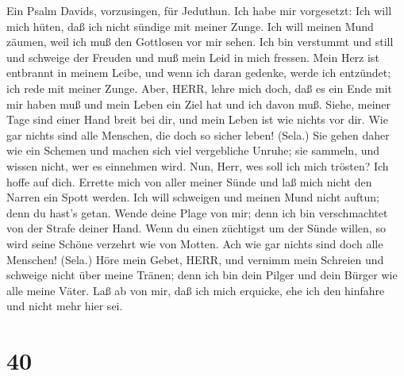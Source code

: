  Ein Psalm Davids, vorzusingen, für Jeduthun. Ich habe mir
vorgesetzt: Ich will mich hüten, daß ich nicht sündige mit meiner Zunge.
Ich will meinen Mund zäumen, weil ich muß den Gottlosen vor mir sehen.
 Ich bin verstummt und still und schweige der Freuden und
muß mein Leid in mich fressen.  Mein Herz ist entbrannt in
meinem Leibe, und wenn ich daran gedenke, werde ich entzündet; ich rede
mit meiner Zunge.  Aber, HERR, lehre mich doch, daß es ein
Ende mit mir haben muß und mein Leben ein Ziel hat und ich davon muß.
 Siehe, meiner Tage sind einer Hand breit bei dir, und mein
Leben ist wie nichts vor dir. Wie gar nichts sind alle Menschen, die
doch so sicher leben! (Sela.)  Sie gehen daher wie ein
Schemen und machen sich viel vergebliche Unruhe; sie sammeln, und wissen
nicht, wer es einnehmen wird.  Nun, Herr, wes soll ich mich
trösten? Ich hoffe auf dich.  Errette mich von aller meiner
Sünde und laß mich nicht den Narren ein Spott werden.  Ich
will schweigen und meinen Mund nicht auftun; denn du hast's getan.
 Wende deine Plage von mir; denn ich bin verschmachtet von
der Strafe deiner Hand.  Wenn du einen züchtigst um der
Sünde willen, so wird seine Schöne verzehrt wie von Motten. Ach wie gar
nichts sind doch alle Menschen! (Sela.)  Höre mein Gebet,
HERR, und vernimm mein Schreien und schweige nicht über meine Tränen;
denn ich bin dein Pilger und dein Bürger wie alle meine Väter.
 Laß ab von mir, daß ich mich erquicke, ehe ich den
hinfahre und nicht mehr hier sei.

\hypertarget{section-39}{%
\section{40}\label{section-39}}

